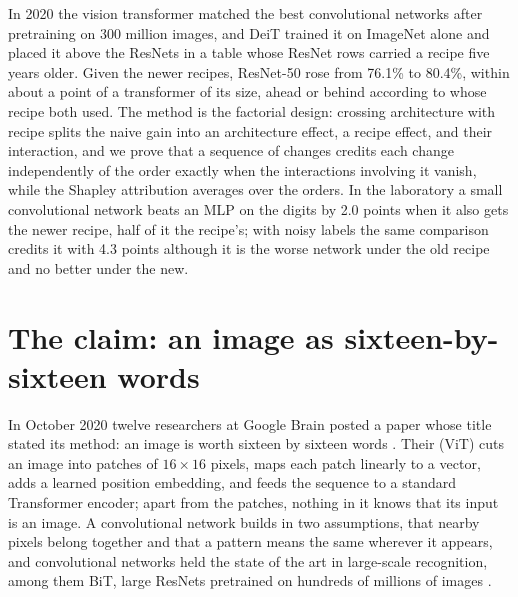 \begin{refsection}

\begin{chaptersummary}
In 2020 the vision transformer matched the best convolutional networks after pretraining on 300 million images, and DeiT trained it on ImageNet alone and placed it above the ResNets in a table whose ResNet rows carried a recipe five years older. Given the newer recipes, ResNet-50 rose from 76.1\% to 80.4\%, within about a point of a transformer of its size, ahead or behind according to whose recipe both used. The method is the factorial design: crossing architecture with recipe splits the naive gain into an architecture effect, a recipe effect, and their interaction, and we prove that a sequence of changes credits each change independently of the order exactly when the interactions involving it vanish, while the Shapley attribution averages over the orders. In the laboratory a small convolutional network beats an MLP on the digits by 2.0 points when it also gets the newer recipe, half of it the recipe's; with noisy labels the same comparison credits it with 4.3 points although it is the worse network under the old recipe and no better under the new.
\end{chaptersummary}

\section{The claim: an image as sixteen-by-sixteen words}\label{sec:confounding:claim}

In October 2020 twelve researchers at Google Brain posted a paper whose title stated its method: an image is worth sixteen by sixteen words \parencite{DosovitskiyEtAl2021}. Their  (ViT) cuts an image into patches of $16\times16$ pixels, maps each patch linearly to a vector, adds a learned position embedding, and feeds the sequence to a standard Transformer encoder; apart from the patches, nothing in it knows that its input is an image. A convolutional network builds in two assumptions, that nearby pixels belong together and that a pattern means the same wherever it appears, and convolutional networks held the state of the art in large-scale recognition, among them BiT, large ResNets pretrained on hundreds of millions of images \parencite{KolesnikovEtAl2020}.


\end{refsection}

